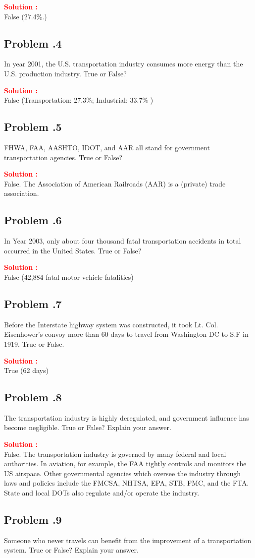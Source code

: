 \documentclass[12pt]{article}
\newcommand{\customsubsection}[1]{
  \subsection*{Problem \thesection.#1}
}
\begin{document}
\textbf{\textcolor{red}{Solution :}} \\
False (27.4\%.)

\newpage

\customsubsection{4}
In year 2001, the U.S. transportation industry consumes more energy than the U.S. production industry. True or False? 


\textbf{\textcolor{red}{Solution :}} \\
False (Transportation: 27.3\%; Industrial: 33.7\% ) 

\newpage



\customsubsection{5}
FHWA, FAA, AASHTO, IDOT, and AAR all stand for government transportation agencies. True or False? 


\textbf{\textcolor{red}{Solution :}} \\
False. The Association of American Railroads (AAR) is a (private) trade association.

\newpage

\customsubsection{6}
In Year 2003, only about four thousand fatal transportation accidents in total occurred in the United States. True or False?


\textbf{\textcolor{red}{Solution :}} \\
False (42,884 fatal motor vehicle fatalities)

\newpage

\customsubsection{7}
Before the Interstate highway system was constructed, it took Lt. Col. Eisenhower’s convoy more than 60 days to travel from Washington DC to S.F in 1919. True or False.


\textbf{\textcolor{red}{Solution :}} \\
True (62 days)
\newpage

\customsubsection{8}
The transportation industry is highly deregulated, and government influence has become negligible. True or False? Explain your answer.


\textbf{\textcolor{red}{Solution :}} \\
False. The transportation industry is governed by many federal and local authorities. In aviation, for example, the FAA tightly controls and monitors the US airspace. Other governmental agencies which oversee the industry through laws and policies include the FMCSA, NHTSA, EPA, STB, FMC, and the FTA. State and local DOTs also regulate and/or operate the industry.
\newpage


\customsubsection{9}
Someone who never travels can benefit from the improvement of a transportation system. True or False? Explain your answer. 
\end{document}
